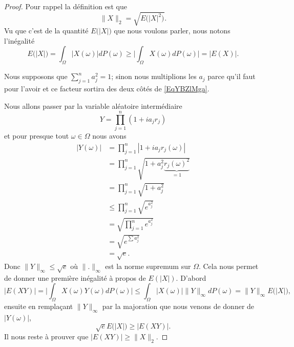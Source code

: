 \begin{proof}
   Pour rappel la définition est que
   \begin{equation}
       \| X \|_2=\sqrt{  E\big( | X |^2 \big)}.
   \end{equation} 
   Vu que c'est de la quantité \( E\big( | X | \big)\) que nous voulons parler, nous notons l'inégalité 
   \begin{equation}
       E\big( | X | \big)=\int_{\Omega}\big| X(\omega) \big|dP(\omega)\geq \big| \int_{\Omega}X(\omega)dP(\omega) \big|=\big| E(X) \big|.
   \end{equation}
   
   Nous supposons que \( \sum_{j=1}^na_j^2=1\); sinon nous multiplions les \(a_j\) parce qu'il faut pour l'avoir et ce facteur sortira des deux côtés de \eqref{EqYBZlMga}. 
   
   Nous allons passer par la variable aléatoire intermédiaire
   \begin{equation}
       Y=\prod_{j=1}^n(1+ia_jr_j)
   \end{equation}
   et pour presque tout \( \omega\in \Omega\) nous avons
   \begin{subequations}
       \begin{align}
           | Y(\omega) |&=\prod_{j=1}^n| 1+ia_jr_j(\omega) |\\
           &=\prod_{j=1}^n\sqrt{1+a^2_j\underbrace{r_j(\omega)^2}_{=1}}\\
           &=\prod_{j=1}^n\sqrt{1+a_j^2 }\\
           &\leq\prod_{j=1}^n\sqrt{  e^{a_j^2} }\\
           &=\sqrt{\prod_{j=1}^n e^{a_j^2}}\\
           &=\sqrt{ e^{\sum a_j^2}}\\
           &=\sqrt{e}.
       \end{align}
   \end{subequations}
   Donc \( \| Y \|_{\infty}\leq \sqrt{e}\) où \( \| . \|_{\infty}\) est la norme supremum sur \( \Omega\). Cela nous permet de donner une première inégalité à propos de \( E(| X |)\). D'abord
   \begin{equation}
       \big| E(XY) \big|=\big| \int_{\Omega}X(\omega)Y(\omega)dP(\omega) \big|\leq \int_{\Omega}\big| X(\omega) \big|\| Y \|_{\infty}dP(\omega)=\| Y \|_{\infty}E\big( | X | \big),
   \end{equation}
   ensuite en remplaçant \( \| Y \|_{\infty}\) par la majoration que nous venons de donner de \( | Y(\omega) |\),
   \begin{equation} \label{EqYVbzyGb}
       \sqrt{e}E\big( | X | \big)\geq \big| E(XY) \big|.
   \end{equation}
   Il nous reste à prouver que \( \big| E(XY) \big|\geq \| X \|_2\).


\end{proof}
